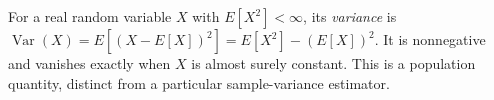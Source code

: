 
For a real random variable $X$ with $E[X^2]<\infty$, its \emph{variance} is $\operatorname{Var}(X)=E[(X-E[X])^2]=E[X^2]-(E[X])^2$. It is nonnegative and vanishes exactly when $X$ is almost surely constant. This is a population quantity, distinct from a particular sample-variance estimator.
